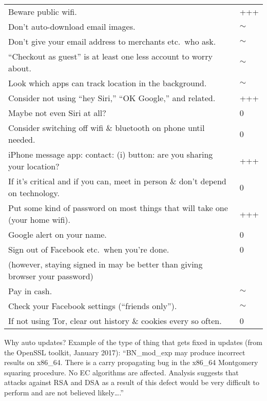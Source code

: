 \documentclass{tufte-handout}
\begin{document}
\begin{tabular}{p{5in}l}
Beware public wifi. & +++ \\

Don't auto-download email images. & $\sim$ \\

Don't give your email address to merchants etc.\ who ask. & $\sim$ \\

``Checkout as guest'' is at least one less account to worry about. & $\sim$ \\

Look which apps can track location in the background. & $\sim$ \\

Consider not using ``hey Siri,'' ``OK Google,'' and related. & +++ \\

Maybe not even Siri at all? & 0 \\

Consider switching off wifi \& bluetooth on phone until needed. & 0 \\

iPhone message app: contact: (i) button: are you sharing your location? & +++ \\

If it's critical and if you can, meet in person \& don't depend on technology. & 0 \\

Put some kind of password on most things that will take one (your home wifi). & +++ \\

Google alert on your name. & 0 \\

Sign out of Facebook etc.\ when you're done. & 0 \\

\qquad \small(however, staying signed in may be better than giving browser your password) \\

Pay in cash. & $\sim$ \\

Check your Facebook settings (``friends only''). & $\sim$ \\

If not using Tor, clear out history \& cookies every so often. & 0 \\
\hline
\end{tabular}

\vspace{4ex}

Why auto updates? Example of the type of thing that gets fixed in
updates (from the OpenSSL toolkit, January 2017): ``BN\_mod\_exp may
produce incorrect results on x86\_64. There is a carry propagating bug
in the x86\_64 Montgomery squaring procedure. No EC algorithms are
affected. Analysis suggests that attacks against RSA and DSA as a
result of this defect would be very difficult to perform and are not
believed likely\ldots{}.''
\end{document}
